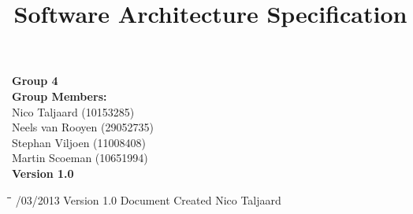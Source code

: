 \documentclass[12pt]{article}
\title{Software Architecture Specification}
\begin{document}

\maketitle

\vspace{4em}

\begin{center}%

  \LARGE {\bf Group 4}\\[2em]
  \LARGE {\bf Group Members:}\\[1em]
  \large
      Nico Taljaard			(10153285)	\\
      Neels van Rooyen		(29052735)	\\
	  Stephan Viljoen       (11008408)  \\
	  Martin Scoeman		(10651994)	\\[6em]
      
      {\bf Version 1.0}
    
\end{center}%

\newpage


\begin{tabbing}
\hspace*{3cm}\=\hspace*{3cm}\=\hspace*{8cm}\=\hspace*{3cm} /03/2013 \> Version 1.0 \> Document Created \> Nico Taljaard\\

\end{tabbing}

\newpage


\tableofcontents

\newpage

\end{document}
